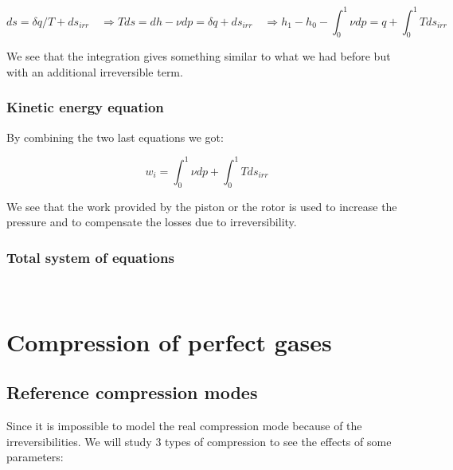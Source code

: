 \begin{equation}
ds = \delta q/T + ds_{irr} \quad \Rightarrow Tds = dh - \nu dp = \delta q + ds_{irr} \quad \Rightarrow h_1 - h_0 - \int _0 ^1 \nu dp = q + \int _0 ^1 Tds_{irr}
\end{equation}

We see that the integration gives something similar to what we had before but with an additional irreversible term. 

\subsubsection{Kinetic energy equation}
By combining the two last equations we got: 

\begin{equation}
w_i = \int _0 ^1 \nu dp + \int _0 ^1 Tds_{irr}
\end{equation}

We see that the work provided by the piston or the rotor is used to increase the pressure and to compensate the losses due to irreversibility. 

\subsubsection{Total system of equations}
\ \\

\section{Compression of perfect gases}
\subsection{Reference compression modes}
Since it is impossible to model the real compression mode because of the irreversibilities. We will study 3 types of compression to see the effects of some parameters: 

